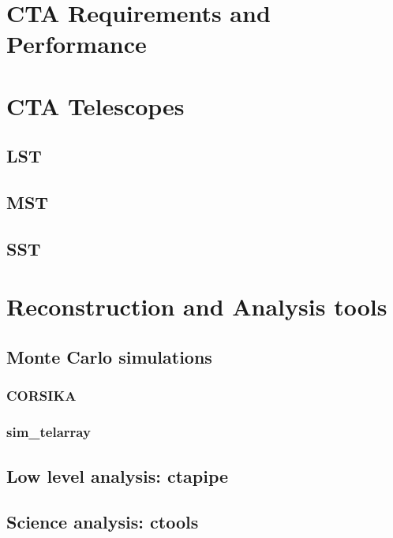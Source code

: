 \documentclass[main.tex]{subfiles}
\begin{document}
\section{CTA Requirements and Performance} \label{sec:ctaperformance}
\section{CTA Telescopes} \label{sec:ctatelescopes}
\subsection{LST}
\subsection{MST}
\subsection{SST}
\section{Reconstruction and Analysis tools} \label{sec:ctaanalysis}
\subsection{Monte Carlo simulations}
\subsubsection{CORSIKA}
\subsubsection{sim\_telarray}
\subsection{Low level analysis: ctapipe}
\subsection{Science analysis: ctools}
\end{document}
